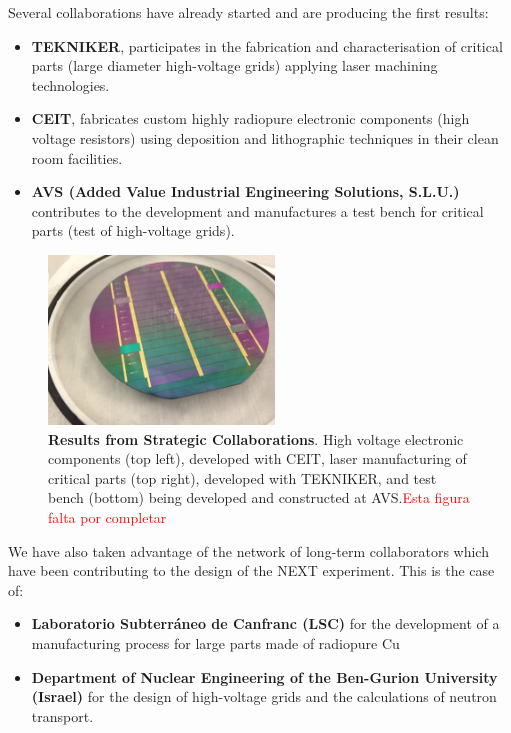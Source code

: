 \documentclass[12pt,a4paper,article]{report} %
\begin{document}
Several collaborations have already started and are producing the first results:
\begin{itemize}
\item \textbf{ TEKNIKER}, participates in the fabrication and characterisation of critical parts (large diameter high-voltage grids)  applying laser machining technologies. 
\item \textbf{ CEIT}, fabricates custom highly radiopure electronic components (high voltage resistors) using deposition and lithographic techniques in their clean room facilities. 
\item \textbf{AVS (Added Value Industrial Engineering Solutions, S.L.U.)} contributes to the development and manufactures a test bench for critical parts (test of high-voltage grids).
\end{itemize}

\begin{figure}[htbp]
\begin{center}
\includegraphics[width=6cm]{ceit}
\caption{\textbf{Results from Strategic Collaborations}. High voltage electronic components (top left), developed with CEIT, laser manufacturing of critical parts (top right), developed with TEKNIKER, and test bench (bottom) being developed and constructed at AVS.\textcolor{red}{Esta figura falta por completar}}
\label{collaborations}
\end{center}
\end{figure}

We have also taken advantage of the network of long-term collaborators which have been contributing to the design of the NEXT experiment. This is the case of:
\begin{itemize}
\item \textbf{Laboratorio Subterr\'aneo de Canfranc (LSC)} for the development of a manufacturing process for large parts made of radiopure Cu 
\item \textbf{Department of Nuclear Engineering of the Ben-Gurion University (Israel)} for the design of high-voltage grids and the calculations of neutron transport. 
\end{itemize}
\end{document}
